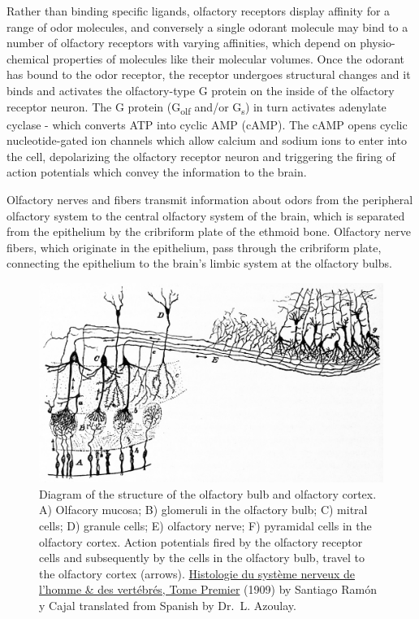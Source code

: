 Rather than binding specific ligands, olfactory receptors display affinity for a range of odor molecules, and conversely a single odorant molecule may bind to a number of olfactory receptors with varying affinities, which depend on physio-chemical properties of molecules like their molecular volumes. Once the odorant has bound to the odor receptor, the receptor undergoes structural changes and it binds and activates the olfactory-type G protein on the inside of the olfactory receptor neuron. The G protein (G\textsubscript{olf} and/or G\textsubscript{s}) in turn activates adenylate cyclase - which converts ATP into cyclic AMP (cAMP). The cAMP opens cyclic nucleotide-gated ion channels which allow calcium and sodium ions to enter into the cell, depolarizing the olfactory receptor neuron and triggering the firing of action potentials which convey the information to the brain.

Olfactory nerves and fibers transmit information about odors from the peripheral olfactory system to the central olfactory system of the brain, which is separated from the epithelium by the cribriform plate of the ethmoid bone. Olfactory nerve fibers, which originate in the epithelium, pass through the cribriform plate, connecting the epithelium to the brain's limbic system at the olfactory bulbs.



\begin{figure}

{\centering \includegraphics[width=0.7\linewidth]{./figures/olfactory/CajalOlfactoryPathway} 

}

\caption{Diagram of the structure of the olfactory bulb and olfactory cortex. A) Olfacory mucosa; B) glomeruli in the olfactory bulb; C) mitral cells; D) granule cells; E) olfactory nerve; F) pyramidal cells in the olfactory cortex. Action potentials fired by the olfactory receptor cells and subsequently by the cells in the olfactory bulb, travel to the olfactory cortex (arrows). \href{https://wellcomelibrary.org/item/b2129592x\#?c=0\&m=0\&s=0\&cv=14\&z=0\%2C-3.48\%2C1\%2C8.6591}{Histologie du système nerveux de l'homme \& des vertébrés, Tome Premier} (1909) by Santiago Ramón y Cajal translated from Spanish by Dr.~L. Azoulay.}\label{fig:olfactory}
\end{figure}

